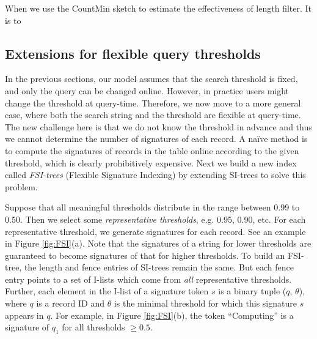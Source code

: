 When we use the CountMin sketch to estimate the effectiveness of length filter. It is to

%
%
%
%
%
%
%
%
%


\subsection{Extensions for flexible query thresholds} \label{subsec:flexible}

In the previous sections, our model assumes that the search threshold is fixed, and only the query can be changed online. However, in practice users might change the threshold at query-time. Therefore, we now move to a more general case, where both the search string and the threshold are flexible at query-time. The new challenge here is that we do not know the threshold in advance and thus we cannot determine the number of signatures of each record. A na\"{i}ve method is to compute the signatures of records in the table online according to the given threshold, which  is clearly prohibitively expensive. Next we build a new index called \textit{FSI-trees} (Flexible Signature Indexing) by extending SI-trees to solve this problem.

Suppose that all meaningful thresholds distribute in the range between 0.99 to 0.50. Then we select some \textit{representative thresholds}, e.g. 0.95, 0.90, etc.   For each representative threshold, we generate signatures for each record. See an example in Figure \ref{fig:FSI}(a). Note that the signatures of a string for lower thresholds are guaranteed to become signatures of that for higher thresholds. To build an FSI-tree,  the length and fence entries of SI-trees remain the same. But each fence entry points to a set of I-lists which come from \textit{all} representative thresholds. Further, each element in the I-list of a signature token $s$ is a binary tuple ($q$, $\theta$), where $q$ is a record ID and $\theta$ is the minimal threshold for which this signature $s$ appears in $q$. For example, in Figure \ref{fig:FSI}(b), the token ``\textsf{Computing}''  is a signature of $q_1$ for all thresholds $\geq 0.5$.

